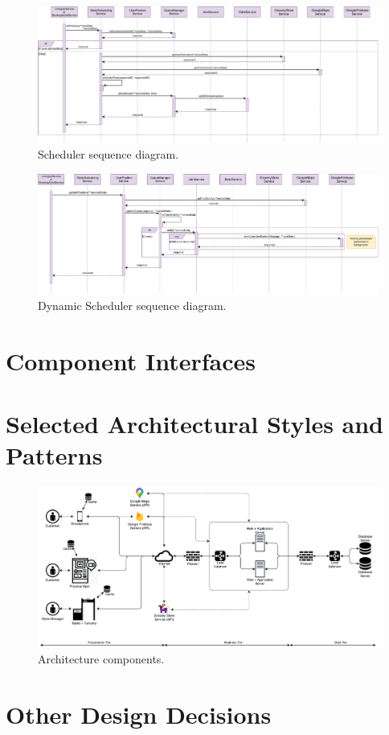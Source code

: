 \begin{figure}[H]
	\centering
	\includegraphics[width=1.0\textwidth]{images/scheduler_sequence_diagram.pdf}
	\caption{Scheduler sequence diagram.}
\end{figure}

\begin{figure}[H]
	\centering
	\includegraphics[width=1.0\textwidth]{images/dynamicScheduler_sequence_diagram.pdf}
	\caption{Dynamic Scheduler sequence diagram.}
\end{figure}

\section{Component Interfaces}

\section{Selected Architectural Styles and Patterns}

\begin{figure}[H] %
	\centering
	\includegraphics[width=1.0\textwidth]{images/architecture_components.pdf}
	\caption{Architecture components.}
\end{figure} %

\section{Other Design Decisions}